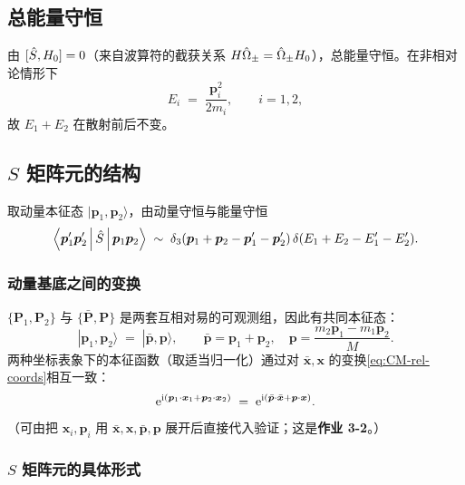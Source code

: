 \subsection{总能量守恒}

由 $[\hat{S},H_0]=0$（来自波算符的截获关系 $H\hat{\Omega}_{\pm}=\hat{\Omega}_{\pm}H_0$），总能量守恒。在非相对论情形下
\begin{equation}
  E_i \;=\; \frac{\bm{p}_i^2}{2m_i},\qquad i=1,2,
\end{equation}
故 $E_1+E_2$ 在散射前后不变。

\subsection{$S$ 矩阵元的结构}

取动量本征态 $|\bm{p}_1,\bm{p}_2\rangle$，由动量守恒与能量守恒
\begin{equation}
  \left\langle \bm{p}_1'\bm{p}_2' \,\middle|\, \hat{S} \,\middle|\, \bm{p}_1\bm{p}_2 \right\rangle
  \;\sim\; \delta_3(\bm{p}_1+\bm{p}_2-\bm{p}_1'-\bm{p}_2')\,\delta(E_1+E_2-E_1'-E_2').
  \label{eq:S-matrix-deltas}
\end{equation}

\subsubsection*{动量基底之间的变换}

$\{\bm{P}_1,\bm{P}_2\}$ 与 $\{\bar{\bm{P}},\bm{P}\}$ 是两套互相对易的可观测组，因此有共同本征态：
\begin{equation}
  |\bm{p}_1,\bm{p}_2\rangle \;=\; |\bar{\bm{p}},\bm{p}\rangle, \qquad
  \bar{\bm{p}}=\bm{p}_1+\bm{p}_2,\quad \bm{p}=\frac{m_2\bm{p}_1-m_1\bm{p}_2}{M}.
\end{equation}
两种坐标表象下的本征函数（取适当归一化）通过对 $\bar{\bm{x}},\bm{x}$ 的变换\eqref{eq:CM-rel-coords}相互一致：
\begin{equation}
  \mathrm{e}^{\mathrm{i}(\bm{p}_1\cdot\bm{x}_1+\bm{p}_2\cdot\bm{x}_2)}
  \;=\; \mathrm{e}^{\mathrm{i}(\bar{\bm{p}}\cdot\bar{\bm{x}}+\bm{p}\cdot\bm{x})}.
  \label{eq:plane-wave-identity}
\end{equation}
（可由把 $\bm{x}_i,\bm{p}_i$ 用 $\bar{\bm{x}},\bm{x},\bar{\bm{p}},\bm{p}$ 展开后直接代入验证；这是\textbf{作业 3-2}。）

\subsubsection*{$S$ 矩阵元的具体形式}

